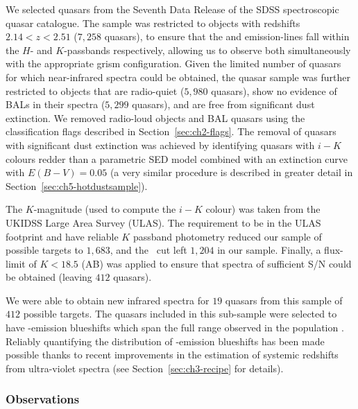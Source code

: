 We selected quasars from the Seventh Data Release \citep[DR$7$;][]{schneider10} of the SDSS spectroscopic quasar catalogue.  
The sample was restricted to objects with redshifts $2.14 < z <2.51$ ($7,258$ quasars), to ensure that the \hb and \ha emission-lines fall within the $H$- and $K$-passbands respectively, allowing us to observe both simultaneously with the appropriate grism configuration.
Given the limited number of quasars for which near-infrared spectra could be obtained, the quasar sample was further restricted to objects that are radio-quiet ($5,980$ quasars), show no evidence of BALs in their spectra ($5,299$ quasars), and are free from significant dust extinction. 
We removed radio-loud objects and BAL quasars using the classification flags described in Section~\ref{sec:ch2-flags}. 
The removal of quasars with significant dust extinction was achieved by identifying quasars with $i-K$ colours redder than a parametric SED model combined with an extinction curve with $E(B-V)=0.05$ (a very similar procedure is described in greater detail in Section~\ref{sec:ch5-hotdustsample}). 

The $K$-magnitude (used to compute the $i-K$ colour) was taken from the UKIDSS Large Area Survey (ULAS). 
The requirement to be in the ULAS footprint and have reliable $K$ passband photometry reduced our sample of possible targets to $1,683$, and the \ebv\, cut left $1,204$ in our sample. 
Finally, a flux-limit of $K<18.5$ (AB) was applied to ensure that spectra of sufficient S/N could be obtained (leaving $412$ quasars). 
 
We were able to obtain new infrared spectra for $19$ quasars from this sample of $412$ possible targets. 
The quasars included in this sub-sample were selected to have -emission blueshifts which span the full range observed in the population \citep[e.g.][]{richards11}. 
Reliably quantifying the distribution of -emission blueshifts has been made possible thanks to recent improvements in the estimation of systemic redshifts from ultra-violet spectra (see Section~\ref{sec:ch3-recipe} for details). 

\subsubsection{Observations}

